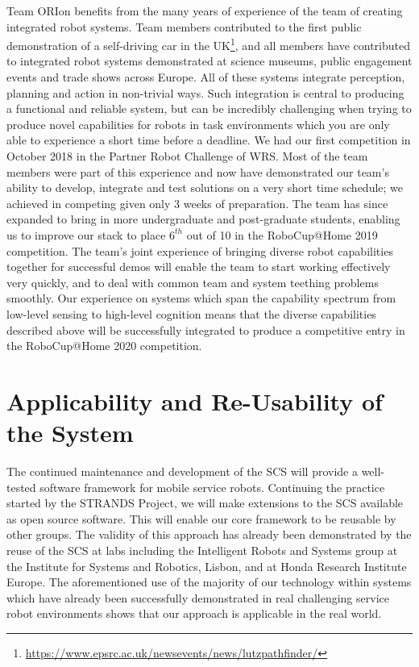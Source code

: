 \documentclass[runningheads,a4paper]{llncs}
\newcommand{\teamori}{Team ORIon}
\begin{document}
\teamori{} benefits from the many years of experience of the team of creating integrated robot systems. Team members contributed to the first public demonstration of a self-driving car in the UK\footnote{\url{https://www.epsrc.ac.uk/newsevents/news/lutzpathfinder/}}, and all members have contributed to integrated robot systems demonstrated at science museums, public engagement events and trade shows across Europe. All of these systems integrate perception, planning and action in non-trivial ways. Such integration is central to producing a functional and reliable system, but can be incredibly challenging when trying to produce novel capabilities for robots in task environments which you are only able to experience a short time before a deadline. We had our
first competition in October 2018 in the Partner Robot Challenge of WRS. 
Most of the team members were part of this experience and now have demonstrated
our team's ability to develop, integrate and test solutions on a very short
time schedule; we achieved in competing given only 3 weeks of preparation. The team has since expanded to bring in more undergraduate and post-graduate students, enabling us to improve our stack to place $6^{th}$ out of 10 in the RoboCup@Home 2019 competition.
The team's joint experience of bringing diverse robot capabilities together for successful demos will enable the team to start working effectively very quickly, and to deal with common team and system teething problems smoothly. Our experience on systems which span the capability spectrum from low-level sensing to high-level cognition means that the diverse capabilities described above will be successfully integrated to produce a competitive entry in the RoboCup@Home 2020 competition.


\section{Applicability and Re-Usability of the System}




The continued maintenance and development of the SCS will provide a well-tested software framework for mobile service robots. Continuing the practice started by the STRANDS Project, we will make extensions to the SCS available as open source software. This will enable our core framework to be reusable by other groups. The validity of this approach has already been demonstrated by the reuse of the SCS at labs including the Intelligent Robots and Systems group at the Institute for Systems and Robotics, Lisbon, and at Honda Research Institute Europe. The aforementioned use of the majority of our technology within systems which have already been successfully demonstrated in real challenging service robot environments shows that our approach is applicable in the real world.
\end{document}
